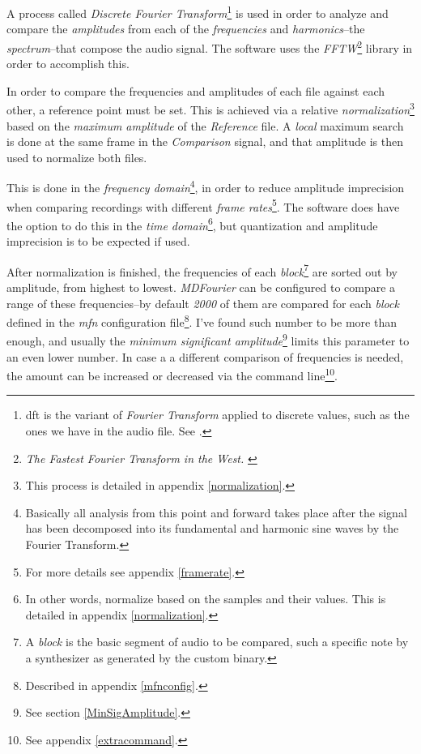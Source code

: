 \documentclass[10pt,a4paper]{report}
\begin{document}
A process called \textit{Discrete Fourier Transform}\footnote{\gls{dft} is the variant of \textit{Fourier Transform} applied to discrete values, such as the ones we have in the audio file. See \cite{FourierTransformApps}.} is used in order to analyze and compare the \textit{amplitudes} from each of the \textit{frequencies} and \textit{harmonics}--the \textit{spectrum}--that compose the audio signal. The software uses the \textit{FFTW}\footnote{\textit{The Fastest Fourier Transform in the West.} \cite{fftw}} library in order to accomplish this.

In order to compare the frequencies and amplitudes of each file against each other, a reference point must be set. This is achieved via a relative \textit{normalization}\footnote{This process is detailed in appendix \ref{normalization}.} based on the \textit{maximum amplitude} of the \textit{Reference} file. A \textit{local} maximum search is done at the same frame in the \textit{Comparison} signal, and that amplitude is then used to normalize both files. 

This is done in the \textit{frequency domain}\footnote{Basically all analysis from this point and forward takes place after the signal has been decomposed into its fundamental and harmonic sine waves by the Fourier Transform.}, in order to reduce amplitude imprecision when comparing recordings with different \textit{frame rates}\footnote{For more details see appendix \ref{framerate}.}. The software does have the option to do this in the \textit{time domain}\footnote{In other words, normalize based on the samples and their values. This is detailed in appendix \ref{normalization}.}, but quantization and amplitude imprecision is to be expected if used.

After normalization is finished, the frequencies of each \textit{block}\footnote{A \textit{block} is the basic segment of audio to be compared, such a specific note by a synthesizer as generated by the custom binary.} are sorted out by amplitude, from highest to lowest. \textit{MDFourier} can be configured to compare a range of these frequencies--by default \textit{2000} of them are compared for each \textit{block} defined in the \textit{mfn} configuration file\footnote{Described in appendix \ref{mfnconfig}.}. I've found such number to be more than enough, and usually the \textit{minimum significant amplitude}\footnote{See section \ref{MinSigAmplitude}.} limits this parameter to an even lower number. In case a a different comparison of frequencies is needed, the amount can be increased or decreased via the command line\footnote{See appendix \ref{extracommand}.}.
\end{document}
